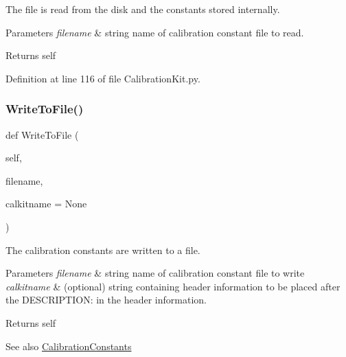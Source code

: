 The file is read from the disk and the constants stored internally. 


\begin{DoxyParams}{Parameters}
{\em filename} & string name of calibration constant file to read. \\
\hline
\end{DoxyParams}
\begin{DoxyReturn}{Returns}
self 
\end{DoxyReturn}


Definition at line 116 of file Calibration\+Kit.\+py.

\mbox{\label{classSignalIntegrity_1_1Measurement_1_1CalKit_1_1CalibrationKit_1_1CalibrationConstants_ac68713cc133371d7a733dd318b5669d3}} 
\subsubsection{\texorpdfstring{Write\+To\+File()}{WriteToFile()}}
{\footnotesize\ttfamily def Write\+To\+File (\begin{DoxyParamCaption}\item[{}]{self,  }\item[{}]{filename,  }\item[{}]{calkitname = {\ttfamily None} }\end{DoxyParamCaption})}



The calibration constants are written to a file. 


\begin{DoxyParams}{Parameters}
{\em filename} & string name of calibration constant file to write \\
\hline
{\em calkitname} & (optional) string containing header information to be placed after the D\+E\+S\+C\+R\+I\+P\+T\+I\+ON\+: in the header information. \\
\hline
\end{DoxyParams}
\begin{DoxyReturn}{Returns}
self 
\end{DoxyReturn}
\begin{DoxySeeAlso}{See also}
\hyperlink{classSignalIntegrity_1_1Measurement_1_1CalKit_1_1CalibrationKit_1_1CalibrationConstants}{Calibration\+Constants} 
\end{DoxySeeAlso}


